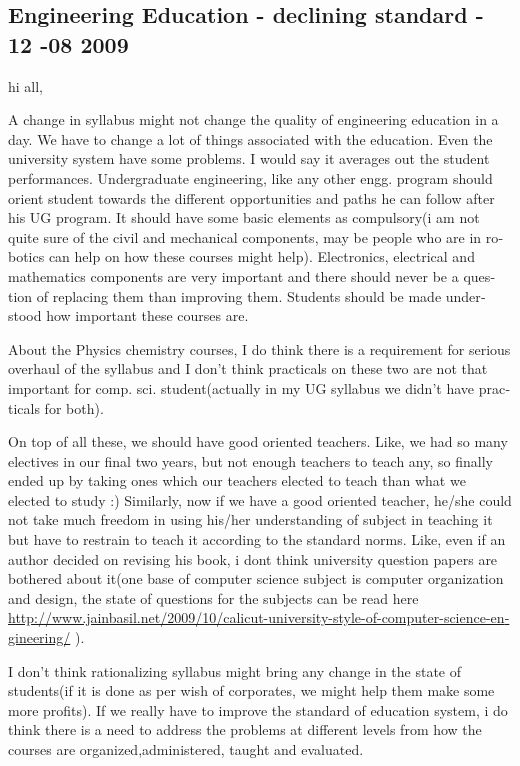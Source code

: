 \begin{english}
\subsection*{Engineering Education - declining standard - 12 -08 2009}

hi all,

A change in syllabus might not change the quality of engineering education in a day. We have to change a lot of things associated with the education. Even the university system have some problems. I would say it averages out the student performances. Undergraduate engineering, like any other engg. program should orient student towards the different opportunities and paths he can follow after his UG program. It should have some basic elements as compulsory(i am not quite sure of the civil and mechanical components, may be people who are in robotics can help on how these courses might help). Electronics, electrical and mathematics components are very important and there should never be a question of replacing them than improving them. Students should be made understood how important these courses are.

About the Physics chemistry courses, I do think there is a requirement for serious overhaul of the syllabus and I don't think practicals on these two are not that important for comp. sci. student(actually in my UG syllabus we didn't have practicals for both).

On top of all these, we should have good oriented teachers. Like, we had so many electives in our final two years, but not enough teachers to teach any, so finally ended up by taking ones which our teachers elected to teach than what we elected to study :) Similarly, now if we have a good oriented teacher, he/she could not take much freedom in using his/her understanding of subject in teaching it but have to restrain to teach it according to the standard norms. Like, even if an author decided on revising his book, i dont think university question papers are bothered about it(one base of computer science subject is computer organization and design, the state of questions for the subjects can be read here \url{http://www.jainbasil.net/2009/10/calicut-university-style-of-computer-science-engineering/} ).

I don't think rationalizing syllabus might bring any change in the state of students(if it is done as per wish of corporates, we might help them make some more profits). If we really have to improve the standard of education system, i do think there is a need to address the problems at different levels from how the courses are organized,administered, taught and evaluated.


\end{english}
